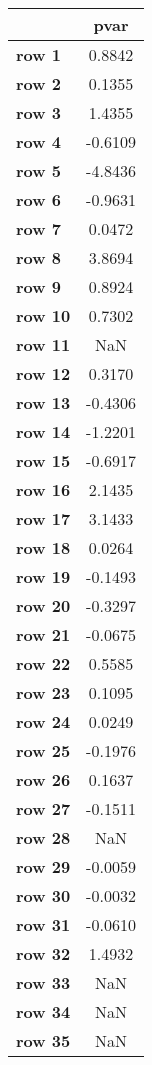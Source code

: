 \begin{tiny}\begin{tabular}{|l|c|}
\hline
&\textbf{pvar}\\\hline
\textbf{row 1}&0.8842\\\hline
\textbf{row 2}&0.1355\\\hline
\textbf{row 3}&1.4355\\\hline
\textbf{row 4}&-0.6109\\\hline
\textbf{row 5}&-4.8436\\\hline
\textbf{row 6}&-0.9631\\\hline
\textbf{row 7}&0.0472\\\hline
\textbf{row 8}&3.8694\\\hline
\textbf{row 9}&0.8924\\\hline
\textbf{row 10}&0.7302\\\hline
\textbf{row 11}&NaN\\\hline
\textbf{row 12}&0.3170\\\hline
\textbf{row 13}&-0.4306\\\hline
\textbf{row 14}&-1.2201\\\hline
\textbf{row 15}&-0.6917\\\hline
\textbf{row 16}&2.1435\\\hline
\textbf{row 17}&3.1433\\\hline
\textbf{row 18}&0.0264\\\hline
\textbf{row 19}&-0.1493\\\hline
\textbf{row 20}&-0.3297\\\hline
\textbf{row 21}&-0.0675\\\hline
\textbf{row 22}&0.5585\\\hline
\textbf{row 23}&0.1095\\\hline
\textbf{row 24}&0.0249\\\hline
\textbf{row 25}&-0.1976\\\hline
\textbf{row 26}&0.1637\\\hline
\textbf{row 27}&-0.1511\\\hline
\textbf{row 28}&NaN\\\hline
\textbf{row 29}&-0.0059\\\hline
\textbf{row 30}&-0.0032\\\hline
\textbf{row 31}&-0.0610\\\hline
\textbf{row 32}&1.4932\\\hline
\textbf{row 33}&NaN\\\hline
\textbf{row 34}&NaN\\\hline
\textbf{row 35}&NaN\\\hline

\end{tabular}
\end{tiny}
